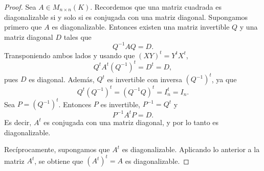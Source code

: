 \documentclass[12pt,a4paper]{article}
\begin{document}
    \begin{proof}
        Sea $A\in M_{n\times n}(K)$. Recordemos que una matriz cuadrada es diagonalizable si y solo si es conjugada con una matriz diagonal. Supongamos primero que $A$ es diagonalizable. Entonces existen una matriz invertible $Q$ y una matriz diagonal $D$ tales que
        \begin{equation*}
            Q^{-1}AQ=D.
        \end{equation*}
        Transponiendo ambos lados y usando que $(XY)^{t}=Y^{t}X^{t}$,
        \begin{equation*}
            Q^{t}A^{t}(Q^{-1})^{t}=D^{t}=D,
        \end{equation*}
        pues $D$ es diagonal. Además, $Q^{t}$ es invertible con inversa $(Q^{-1})^{t}$, ya que
        \begin{equation*}
            Q^{t}(Q^{-1})^{t}=(Q^{-1}Q)^{t}=I_{n}^{t}=I_{n}.
        \end{equation*}
        Sea $P=(Q^{-1})^{t}$. Entonces $P$ es invertible, $P^{-1}=Q^{t}$ y
        \begin{equation*}
            P^{-1}A^{t}P=D.
        \end{equation*}
        Es decir, $A^{t}$ es conjugada con una matriz diagonal, y por lo tanto es diagonalizable.

        Recíprocamente, supongamos que $A^{t}$ es diagonalizable. Aplicando lo anterior a la matriz $A^{t}$, se obtiene que $(A^{t})^{t}=A$ es diagonalizable.
    \end{proof}
\end{document}
